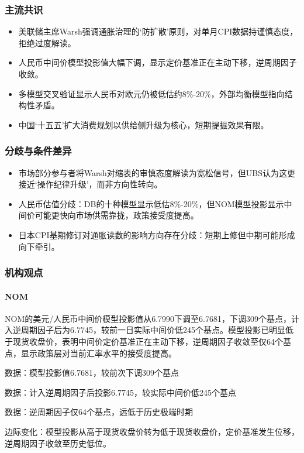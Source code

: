 \documentclass[11pt]{ctexart}
\begin{document}
\subsubsection*{主流共识}
\begin{itemize}
  \item 美联储主席Warsh强调通胀治理的‘防扩散’原则，对单月CPI数据持谨慎态度，拒绝过度解读。
  \item 人民币中间价模型投影值大幅下调，显示定价基准正在主动下移，逆周期因子收敛。
  \item 多模型交叉验证显示人民币对欧元仍被低估约8\%-20\%，外部均衡模型指向结构性矛盾。
  \item 中国‘十五五’扩大消费规划以供给侧升级为核心，短期提振效果有限。
\end{itemize}
\subsubsection*{分歧与条件差异}
\begin{itemize}
  \item 市场部分参与者将Warsh对缩表的审慎态度解读为宽松信号，但UBS认为这更接近‘操作纪律升级’，而非方向性转向。
  \item 人民币估值分歧：DB的十种模型显示低估8\%-20\%，但NOM模型投影显示中间价可能更快向市场供需靠拢，政策接受度提高。
  \item 日本CPI基期修订对通胀读数的影响方向存在分歧：短期上修但中期可能形成向下牵引。
\end{itemize}
\subsubsection*{机构观点}
\paragraph{NOM} NOM的美元/人民币中间价模型投影值从6.7990下调至6.7681，下调309个基点，计入逆周期因子后为6.7745，较前一日实际中间价低245个基点。模型投影已明显低于现货收盘价，表明中间价定价基准正在主动下移，逆周期因子收敛至仅64个基点，显示政策层对当前汇率水平的接受度提高。
{\small\color{refgray}数据：模型投影值6.7681，较前次下调309个基点\par}
{\small\color{refgray}数据：计入逆周期因子后投影6.7745，较实际中间价低245个基点\par}
{\small\color{refgray}数据：逆周期因子仅64个基点，远低于历史极端时期\par}
{\small\color{refgray}边际变化：模型投影从高于现货收盘价转为低于现货收盘价，定价基准发生位移，逆周期因子收敛至历史低位。\par}
\end{document}
